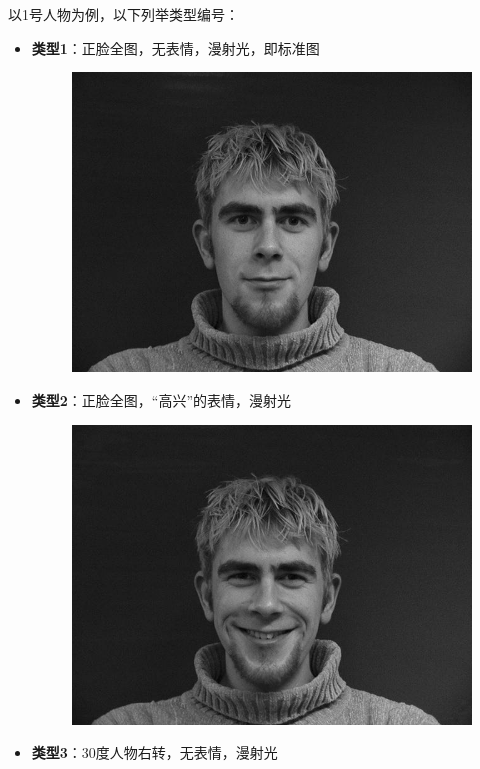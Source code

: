 以1号人物为例，以下列举类型编号：
\begin{itemize}
\item \textbf{类型1}：正脸全图，无表情，漫射光，即标准图
  \begin{figure}[H]
    \centering
    \includegraphics[keepaspectratio=true,
    scale=0.33]{images/gs0/gs0.jpg}
  \end{figure}
\item \textbf{类型2}：正脸全图，“高兴”的表情，漫射光
  \begin{figure}[H]
    \centering
    \includegraphics[keepaspectratio=true,
    scale=0.33]{images/gs0/gs1.jpg}
  \end{figure}
\item \textbf{类型3}：30度人物右转，无表情，漫射光

\end{itemize}
